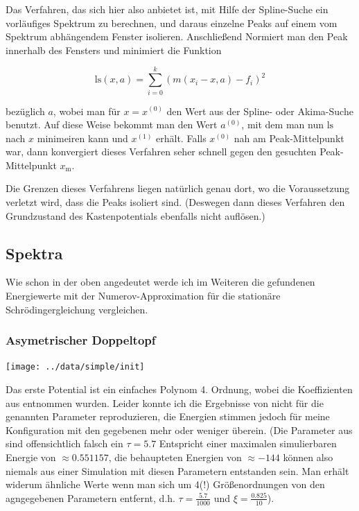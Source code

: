 \documentclass[10pt,a4paper,german]{scrartcl}
\begin{document}
       Das Verfahren, das sich hier also anbietet ist, mit Hilfe der
       Spline-Suche ein vorläufiges Spektrum zu berechnen, und daraus
       einzelne Peaks auf einem vom Spektrum abhängendem Fenster isolieren.
       Anschließend Normiert man den Peak innerhalb des Fensters und minimiert
       die Funktion
       
       \begin{equation}
         \mathrm{ls}(x,a) = \sum_{i = 0}^{k} (m(x_i - x, a) - f_i)^2
       \end{equation}
       
       bezüglich $a$, wobei man für $x=x^{(0)}$ den Wert aus der Spline- 
       oder Akima-Suche
       benutzt. Auf diese Weise bekommt man den Wert $a^{(0)}$, mit dem man
       nun $\mathrm{ls}$ nach $x$ minimeiren kann und $x^{(1)}$ erhält.
       Falls $x^{(0)}$ nah
       am Peak-Mittelpunkt war, dann konvergiert dieses Verfahren seher schnell
       gegen den gesuchten Peak-Mittelpunkt $x_\mathrm{m}$.
       
       Die Grenzen dieses Verfahrens liegen natürlich genau dort, wo die
       Voraussetzung verletzt wird, dass die Peaks isoliert sind. 
       (Deswegen dann dieses Verfahren den Grundzustand des Kastenpotentials 
       ebenfalls nicht auflösen.)
       
   \subsection{Spektra}
		Wie schon in der oben angedeutet werde ich im Weiteren die gefundenen
		Energiewerte mit der Numerov-Approximation für die stationäre 
		Schrödingergleichung vergleichen.
		
  	  \subsubsection{Asymetrischer Doppeltopf}
			  \texttt{[image: ../data/simple/init]}

  		  Das erste Potential ist ein einfaches Polynom 4. Ordnung, wobei die
    		Koeffizienten aus \cite{FFS} entnommen wurden. Leider konnte ich die
    		Ergebnisse von \cite{FFS} nicht für die genannten Parameter reproduzieren, 
  	  	die Energien stimmen jedoch für meine Konfiguration mit den gegebenen mehr 
  		  oder weniger überein. (Die Parameter aus \cite{FFS} sind offensichtlich falsch
    		ein $\tau = 5.7$ Entspricht einer maximalen simulierbaren Energie von
    		$\approx 0.551157$, die behaupteten Energien von $\approx-144$
  	  	können also niemals
    		aus einer Simulation mit diesen Parametern entstanden sein. Man erhält 
    		widerum ähnliche Werte wenn man sich um 4(!) Größenordnungen von
  	  	den agngegebenen Parametern entfernt, d.h. $\tau = \frac{5.7}{1000}$ und
  		  $\xi = \frac{0.825}{10}$).
\end{document}
